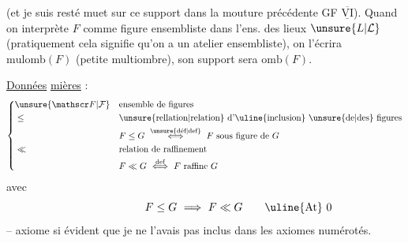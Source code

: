 (et je suis resté muet sur ce support dans la mouture précédente GF $\underline{\overline{\mathrm{VI}}}$). Quand on interprète $F$ comme figure ensembliste dans l'ens. des lieux $\unsure{L|\mathcal L}$  (pratiquement cela signifie qu'on a un atelier ensembliste), on l'écrira $\mathrm{mulomb}(F)$ (petite multiombre), son support sera $\mathrm{omb}(F)$.

\uline{Données} \uline{mières} :
\[
\left\{\begin{aligned}
&\unsure{\mathscr F|\mathcal F} &&\text{ensemble de figures}\\
&\leq &&\text{\unsure{rellation|relation} d'\uline{inclusion} \unsure{de|des} figures}\\
& &&F\leq G\ \overset{\text{\unsure{déf|def}}}{\Longleftrightarrow}\ F\ \text{sous figure de }G\\
&\ll &&\text{relation de raffinement}\\
& && F\ll G\ \overset{\text{def}}{\Longleftrightarrow}\ F\ \text{raffine }G
\end{aligned}\right.
\]
avec
\[
F\leq G\ \Longrightarrow\ F\ll G\tag*{\makebox[0pt][r]{\makebox[\displaywidth][l]{\uline{At} 0}}}
\]
-- axiome si évident que je ne l'avais pas inclus dans les axiomes numérotés.

